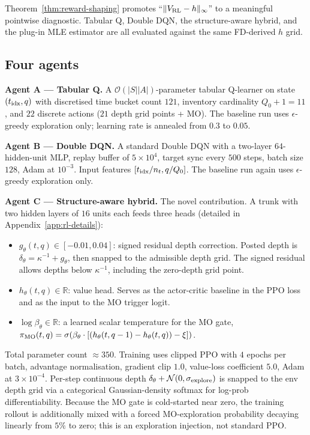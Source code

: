 \documentclass[]{interact}
\theoremstyle{plain}
\theoremstyle{definition}
\theoremstyle{remark}
\newcommand{\R}{\mathbb{R}}
\newcommand{\1}[1]{\mathbf{1}_{\{#1\}}}
\begin{document}
Theorem~\ref{thm:reward-shaping} promotes ``$\|V_{\rm RL} - h\|_\infty$'' to a meaningful pointwise diagnostic. Tabular Q, Double DQN, the structure-aware hybrid, and the plug-in MLE estimator are all evaluated against the same FD-derived $h$ grid.

\subsection{Four agents}\label{sec:four-agents}

\smallskip\noindent\textbf{Agent A --- Tabular Q.} A $\mathcal{O}(|S||A|)$-parameter tabular Q-learner on state $(t_{\rm idx}, q)$ with discretised time bucket count $121$, inventory cardinality $Q_0 + 1 = 11$, and $22$ discrete actions ($21$ depth grid points + MO). The baseline run uses $\epsilon$-greedy exploration only; learning rate is annealed from $0.3$ to $0.05$.

\smallskip\noindent\textbf{Agent B --- Double DQN.} A standard \citet{vanhasselt2016ddqn} Double DQN with a two-layer $64$-hidden-unit MLP, replay buffer of $5\times 10^4$, target sync every $500$ steps, batch size $128$, Adam at $10^{-3}$. Input features $[t_{\rm idx} / n_t, q / Q_0]$. The baseline run again uses $\epsilon$-greedy exploration only.

\smallskip\noindent\textbf{Agent C --- Structure-aware hybrid.} The novel contribution. A trunk with two hidden layers of $16$ units each feeds three heads (detailed in Appendix~\ref{app:rl-details}):
\begin{itemize}
\item $g_\theta(t,q) \in [-0.01,0.04]$: signed residual depth correction. Posted depth is $\delta_\theta = \kappa^{-1} + g_\theta$, then snapped to the admissible depth grid. The signed residual allows depths below $\kappa^{-1}$, including the zero-depth grid point.
\item $h_\theta(t,q) \in \R$: value head. Serves as the actor-critic baseline in the PPO loss and as the input to the MO trigger logit.
\item $\log \beta_\theta \in \R$: a learned scalar temperature for the MO gate, $\pi_{\rm MO}(t,q) = \sigma(\beta_\theta \cdot [(h_\theta(t,q-1) - h_\theta(t,q)) - \xi])$.
\end{itemize}
Total parameter count $\approx 350$. Training uses clipped PPO \citep{schulman2017ppo} with $4$ epochs per batch, advantage normalisation, gradient clip $1.0$, value-loss coefficient $5.0$, Adam at $3\times 10^{-4}$. Per-step continuous depth $\delta_\theta + \mathcal{N}(0, \sigma_{\rm explore})$ is snapped to the env depth grid via a categorical Gaussian-density softmax for log-prob differentiability. Because the MO gate is cold-started near zero, the training rollout is additionally mixed with a forced MO-exploration probability decaying linearly from $5\%$ to zero; this is an exploration injection, not standard PPO.
\end{document}

